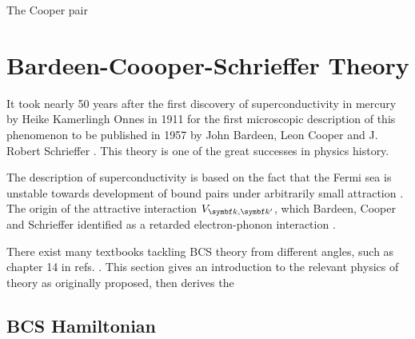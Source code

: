 \documentclass[../notes.tex]{subfiles}
\begin{document}
The Cooper pair






\section{Bardeen-Coooper-Schrieffer Theory}\label{sec:bcs-theory}

It took nearly 50 years after the first discovery of superconductivity in mercury by Heike Kamerlingh Onnes in 1911 \cite{onnesFurtherExperimentsLiquid1991} for the first microscopic description of this phenomenon to be published in 1957 by John Bardeen, Leon Cooper and J. Robert Schrieffer \cite{bardeenTheorySuperconductivity1957}.
This  theory is one of the great successes in physics history.

The  description of superconductivity is based on the fact that the Fermi sea is unstable towards development of bound pairs under arbitrarily small attraction \cite{cooperBoundElectronPairs1956}.
The origin of the attractive interaction \(V_{{\vb{k}, \vb{k}^{\prime}}}\), which Bardeen, Cooper and Schrieffer identified as a retarded electron-phonon interaction \cite{bardeenTheorySuperconductivity1957}.

There exist many textbooks tackling BCS theory from different angles, such as chapter 14 in refs. \cite{colemanIntroductionManyBodyPhysics2015, tinkhamIntroductionSuperconductivity1996}.
This section gives an introduction to the relevant physics of  theory as originally proposed, then derives the 


\subsection{BCS Hamiltonian}

\end{document}
